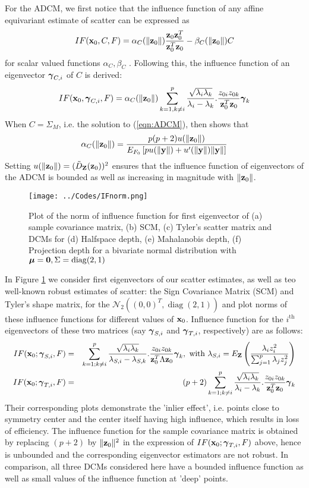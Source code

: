 \documentclass[fleqn,11pt]{article}
\DeclareMathOperator*{\diag}{diag}
\begin{document}
For the ADCM, we first notice that the influence function of any affine equivariant estimate of scatter can be expressed as
%
$$
IF({\bf{x}}_0, C, F) = \alpha_C (\| {\bf{z}}_0 \| ) \frac{{\bf{z}}_0 {\bf{z}}_0^T}{{\bf{z}}_0^T {\bf{z}}_0} - \beta_C( \| {\bf{z}}_0 \| ) C
$$
%
for scalar valued functions $\alpha_C, \beta_C$ \citep{HampelBook86}. Following this, the influence function of an eigenvector ${\boldsymbol{\gamma}}_{C,i}$ of $C$ is derived:
%
$$
IF({\bf{x}}_0, {\boldsymbol{\gamma}}_{C,i}, F) = \alpha_C(\| {\bf{z}}_0 \|) \sum_{k=1, k \neq i}^p \frac{\sqrt {\lambda_i \lambda_k}}{\lambda_i - \lambda_k}. \frac{z_{0i} z_{0k}}{{\bf{z}}_0^T {\bf{z}}_0} {\boldsymbol{\gamma}}_k
$$
%
When $C=\Sigma_M$, i.e. the solution to (\ref{eqn:ADCM}), then \cite{HuberBook81} shows that
%
$$
\alpha_C (\| {\bf{z}}_0 \|) = \frac{p(p+2) u (\| {\bf{z}}_0 \|)}{E_{F_0} \left[ p u(\| {\bf{y}} \| ) + u'(\| {\bf{y}} \|) \| {\bf{y}} \| \right] }
$$
%
Setting $u( \| {\bf{z}}_0 \|) = ( \tilde D_{\mathbf{Z}} ({\bf{z}}_0))^2$ ensures that the influence function of eigenvectors of the ADCM is bounded as well as increasing in magnitude with $\| {\bf{z}}_0 \|$.

\begin{figure}[]
	\centering
		\texttt{[image: ../Codes/IFnorm.png]}
	\caption{Plot of the norm of influence function for first eigenvector of (a) sample covariance matrix, (b) SCM, (c) Tyler's scatter matrix and DCMs for (d) Halfspace depth, (e) Mahalanobis depth, (f) Projection depth for a bivariate normal distribution with $\bfmu = {\bf 0}, \Sigma = \diag(2,1)$}
	\label{fig:IFnorm}
\end{figure}

In Figure \ref{fig:IFnorm} we consider first eigenvectors of our scatter estimates, as well as teo well-known robust estimates of scatter: the Sign Covariance Matrix (SCM) and Tyler's shape matrix, for the $\mathcal{N}_2((0,0)^T, \diag(2,1))$ and plot norms of these influence functions for different values of ${\bf{x}}_0$. Influence function for the $i^\text{th}$ eigenvectors of these two matrices (say ${\boldsymbol{\gamma}}_{S,i}$ and ${\boldsymbol{\gamma}}_{T,i}$, respectively) are as follows:
%
\begin{eqnarray*}
\quad IF({\bf{x}}_0; {\boldsymbol{\gamma}}_{S,i}, F) &=& \sum_{k=1; k \neq i}^p \frac{\sqrt{\lambda_i \lambda_k}}{\lambda_{S,i} - \lambda_{S,k}}. \frac{z_{0i} z_{0k}}{{\bf{z}}_0^T \Lambda {\bf{z}}_0} {\boldsymbol{\gamma}}_k, \text{ with } \lambda_{S,i} = E_{\mathbf{Z}} \left( \frac{\lambda_i z_i^2}{\sum_{j=1}^p \lambda_j z_j^2} \right) \quad \\
IF({\bf{x}}_0; {\boldsymbol{\gamma}}_{T,i}, F) &=& (p+2) \sum_{k=1; k \neq i}^p \frac{\sqrt{\lambda_i \lambda_k}}{\lambda_i - \lambda_k}. \frac{z_{0i} z_{0k}}{{\bf{z}}_0^T {\bf{z}}_0} {\boldsymbol{\gamma}}_k \quad 
\end{eqnarray*}
%
Their corresponding plots demonstrate the 'inlier effect', i.e. points close to symmetry center and the center itself having high influence, which results in loss of efficiency. The influence function for the sample covariance matrix is obtained by replacing $(p+2)$ by $\| {\bf{z}}_0 \|^2$ in the expression of $IF({\bf{x}}_0; {\boldsymbol{\gamma}}_{T,i}, F)$ above, hence is unbounded and the corresponding eigenvector estimators are not robust. In comparison, all three DCMs considered here have a bounded influence function as well as small values of the influence function at 'deep' points.
\end{document}
